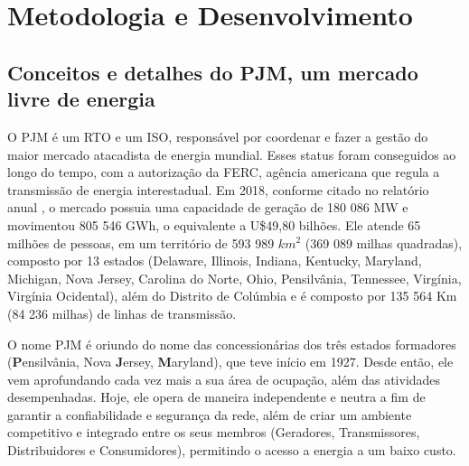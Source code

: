 \chapter[Metodologia e Desenvolvimento]{Metodologia e Desenvolvimento}
\label{metodologia}

\section{Conceitos e detalhes do PJM, um mercado livre de energia}
O PJM é um \ac{RTO} e um \ac{ISO}, responsável por coordenar e fazer a gestão do maior mercado atacadista de energia mundial. Esses status foram conseguidos ao longo do tempo, com a autorização da \ac{FERC}, agência americana que regula a transmissão de energia interestadual. Em 2018, conforme citado no relatório anual \cite{2018_anual_report}, o mercado possuia uma capacidade de geração de 180 086 MW e movimentou 805 546 GWh, o equivalente a U\$49,80 bilhões. Ele atende 65 milhões de pessoas, em um território de 593 989 $km^{2}$ (369 089 milhas quadradas), composto por 13 estados (Delaware, Illinois, Indiana, Kentucky, Maryland, Michigan, Nova Jersey, Carolina do Norte, Ohio, Pensilvânia, Tennessee, Virgínia, Virgínia Ocidental), além do Distrito de Colúmbia e é composto por 135 564 Km (84 236 milhas) de linhas de transmissão. 

O nome PJM é oriundo do nome das concessionárias dos três estados formadores (\textbf{P}ensilvânia, Nova \textbf{J}ersey, \textbf{M}aryland), que teve início em 1927. Desde então, ele vem aprofundando cada vez mais a sua área de ocupação, além das atividades desempenhadas. Hoje, ele opera de maneira independente e neutra a fim de garantir a confiabilidade e segurança da rede, além de criar um ambiente competitivo e integrado entre os seus membros (Geradores, Transmissores, Distribuidores e Consumidores), permitindo o acesso a energia a um baixo custo.

